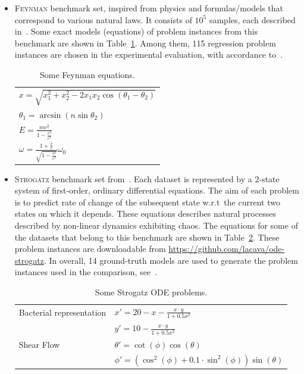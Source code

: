 \documentclass[a4paper,12pt]{elsarticle}
\begin{document}
\begin{itemize}
	\item \textsc{Feynman} benchmark set, inspired from physics and formulas/models that correspond to various natural laws.  
	It consists of $10^5$  samples, each described in~\cite{udrescu2020ai}. Some exact models (equations) of problem instances from this benchmark are shown in Table~\ref{tab:Feynamn-Eq}.  Among them, 115 regression problem instances are chosen in the experimental evaluation, with accordance to~\cite{la2021contemporary}. 
	
   \begin{table}
		\centering
		\begin{tabular}{l}   \hline
	       $x = \sqrt{x_1^2 + x_2^2 - 2 x_1 x_2 \cos(\theta_1 - \theta_2)}$ \\
	       $ \theta_1 = \arcsin(n \sin \theta_2)$ \\
	       $E =  \frac{m c^2 }{1 - \frac{v^2}{c^2}}$ \\
	       $\omega = \frac{1 + \frac{v}{c}}{ \sqrt{1 - \frac{v^2}{c^2}}} \omega_0$ \\ \hline
	       
	    \end{tabular}
		\caption{Some Feynman equations.}
		\label{tab:Feynamn-Eq}
	\end{table}


	\item \textsc{Strogatz} benchmark set from~\cite{la2016inference}. 
	Each dataset is represented by a 2-state system of first-order, ordinary differential equations. 
	The aim of each problem is to predict rate of change of the subsequent state w.r.t\  the current two states on which it depends. These equations describes natural processes described by non-linear dynamics  exhibiting chaos.  The equations for some of the datasets that belong to this benchmark are shown in Table~\ref{table:strogatz-ODEs}. These problem instances are downloadable from \url{https://github.com/lacava/ode-strogatz}. In overall, 14 ground-truth models are used to generate the problem instances used in the comparison, see~\cite{la2021contemporary}. 
	
	
	\begin{table}
		\centering
		\begin{tabular}{ll} \\ \hline
			Bacterial representation &   $x' = 20 - x - \frac{x \cdot y}{1 + 0.5 x^2 }$ \\ 
			                         &   $y' = 10 - \frac{x \cdot y}{1 + 0.5 x^2  }$ \\ \hline
			Shear Flow               &  $\theta' = \cot(\phi)\cos(\theta)$ \\
			                         &  $ \phi'  = ( \cos^2(\phi) + 0.1 \cdot \sin^2 (\phi)) \sin(\theta) $ \\ \hline
		\end{tabular}
	    \caption{Some Strogatz ODE problems.}
	    \label{table:strogatz-ODEs}
	\end{table}
	 

\end{itemize}
\end{document}
